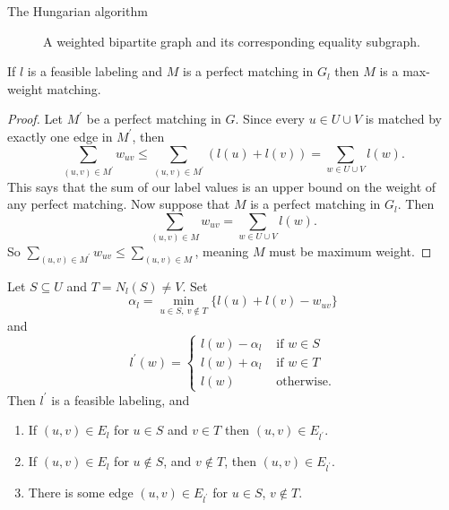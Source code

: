 \documentclass[11pt]{article}
\renewcommand{\'}{^{'}}
\newenvironment{theorem}[2][Theorem]{\begin{trivlist}
\item[\hskip \labelsep {\bfseries #1}\hskip \labelsep {\bfseries #2.}]}{\end{trivlist}}
\newenvironment{lemma}[2][Lemma]{\begin{trivlist}
\item[\hskip \labelsep {\bfseries #1}\hskip \labelsep {\bfseries #2.}]}{\end{trivlist}}
\begin{document}
\begin{section}{The Hungarian algorithm}
\begin{figure}[h]
		\caption{A weighted bipartite graph and its corresponding equality subgraph.}
	\end{figure}
	\begin{theorem}{(Kuhn-Munkres)}
		If $l$ is a feasible labeling and $M$ is a perfect matching in $G_l$ then $M$ is a 
		max-weight matching.
	\end{theorem}

	\begin{proof}
		Let $M\'$ be a perfect matching in $G$. Since every $u\in U\cup V$ is matched 
		by exactly one edge in $M\'$, then 
		\[
			\sum_{(u,v)\in M\'} w_{uv} \leq \sum_{(u,v)\in M\'} (l(u)+l(v)) = 
			\sum_{w\in U\cup V} l(w).
		\]
		This says that the sum of our label values is an upper bound on the weight of any 
		perfect matching.
		Now suppose that $M$ is a perfect matching in $G_l$. Then 
		\[
			\sum_{(u,v)\in M} w_{uv} = \sum_{w\in U\cup V} l(w).
		\]
		So $\sum_{(u,v)\in M\'} w_{uv} \leq \sum_{(u,v)\in M}$, meaning $M$ must be maximum 
		weight.
	\end{proof}

	\begin{lemma}{2}
		Let $S\subseteq U$ and $T = N_l(S) \neq V$. Set 
		\[
			\alpha_l = \min _{u\in S,\ v\notin T} \{l(u) + l(v) - w_{uv}\}
		\]
		and 
		\[
			l\' (w) = 
			\begin{cases}
				l(w) - \alpha_l &\text{ if } w\in S \\
				l(w) + \alpha_l &\text{ if } w\in T \\
				l(w) &\text{ otherwise.}
			\end{cases}
		\]
		Then $l\'$ is a feasible labeling, and 
		\begin{enumerate}
			\item If $(u,v)\in E_l$ for $u\in S$ and $v\in T$ then $(u,v)\in E_{l\'}$.
			\item If $(u,v)\in E_l$ for $u\notin S$, and $v\notin T$, then $(u,v)\in 
				E_{l\'}$.
			\item There is some edge $(u,v)\in E_{l\'}$ for $u\in S$, $v\notin T$.
		\end{enumerate}
	\end{lemma}


\end{section}
\end{document}
